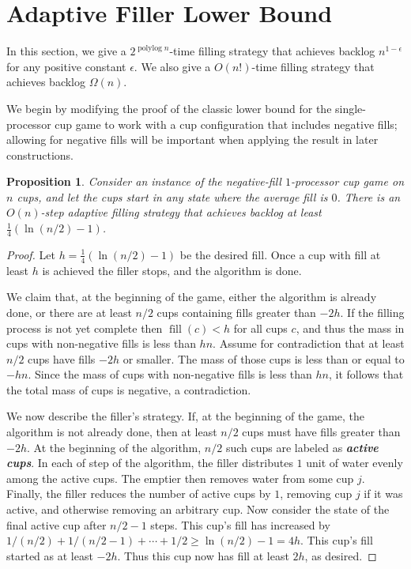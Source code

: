 \documentclass[twocolumn]{article}[10pt]
\newcommand{\defn}[1]{{\textit{\textbf{\boldmath #1}}}\xspace}
\DeclareMathOperator{\polylog}{\text{polylog}}
\DeclareMathOperator{\fil}{\text{fill}}
\newtheorem{proposition}{Proposition}
\begin{document}

\section{Adaptive Filler Lower Bound}\label{sec:adaptive}

In this section, we give a $2^{\polylog n}$-time filling strategy that achieves backlog $n^{1 - \epsilon}$ for any positive constant $\epsilon$. 
We also give a $O(n!)$-time filling strategy that achieves backlog $\Omega(n)$.

We begin by modifying the proof of the classic lower bound for the single-processor cup game to work with a cup configuration that includes negative fills; allowing for negative fills will be important when applying the result in later constructions. 
\begin{proposition}
\label{prop:adaptiveBase}
  Consider an instance of the negative-fill $1$-processor cup game on $n$ cups, and let the cups start in any state where the average fill is $0$. There is an $O(n)$-step adaptive filling strategy that achieves backlog at least
  $\frac{1}{4}(\ln (n/2) - 1)$.
\end{proposition}
\begin{proof}
  Let $h = \frac{1}{4}(\ln (n/2) -1)$ be the desired fill. Once a cup with fill at
  least $h$ is achieved the filler stops, and the algorithm is done.  
  
  We claim that, at the beginning of the game, either the algorithm is already done, or there are at least $n / 2$ cups containing fills greater than $-2h$.
  If the filling process is not yet complete then $\fil(c) < h$ for all cups $c$, and thus the mass in cups with non-negative fills is less than $hn$. 
  Assume for contradiction that at least $n / 2$ cups 
  have fills $-2h$ or smaller. The mass of those cups
  is less than or equal to $-hn$. Since the mass of cups with non-negative fills is less than $hn$, it follows that the total mass of cups is negative, a contradiction. 

  We now describe the filler's strategy. If, at the beginning of the game, the algorithm is not already done,
  then at least $n / 2$ cups must have fills greater than $-2h$. At the beginning of the algorithm, $n / 2$ such cups are labeled as \defn{active cups}. 
  In each of step of the algorithm, the filler distributes $1$ unit of water evenly among the active cups. The emptier then removes water from some cup $j$. Finally, the filler reduces the number of active cups by $1$, removing cup $j$ if it was active, and otherwise removing an arbitrary cup. Now consider the state of the final active cup after $n / 2  - 1$ steps. This cup's
  fill has increased by $1/(n/2) + 1/(n/2 - 1) + \cdots + 1/2 \ge \ln (n/2) -1
  = 4h$. This cup's fill started as at least $-2h$. Thus this cup now has fill at
  least $2h$, as desired.
\end{proof}
\end{document}
